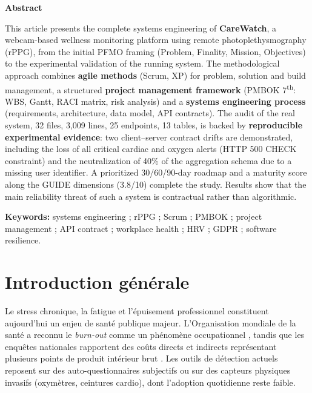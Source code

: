 \documentclass[11pt,a4paper]{article}
\begin{document}
\vspace{0.8cm}
\begin{center}
\color{cwblue}\bfseries\Large Abstract
\end{center}
\noindent This article presents the complete systems engineering of \textbf{CareWatch}, a webcam-based
wellness monitoring platform using remote photoplethysmography (rPPG), from the initial PFMO framing
(Problem, Finality, Mission, Objectives) to the experimental validation of the running system. The
methodological approach combines \textbf{agile methods} (Scrum, XP) for problem, solution and build
management, a structured \textbf{project management framework} (PMBOK 7\textsuperscript{th}: WBS, Gantt,
RACI matrix, risk analysis) and a \textbf{systems engineering process} (requirements, architecture, data
model, API contracts). The audit of the real system, 32 files, 3,009 lines, 25 endpoints, 13 tables,
is backed by \textbf{reproducible experimental evidence}: two client--server contract drifts are
demonstrated, including the loss of all critical cardiac and oxygen alerts (HTTP 500 CHECK constraint)
and the neutralization of 40\% of the aggregation schema due to a missing user identifier. A prioritized
30/60/90-day roadmap and a maturity score along the GUIDE dimensions (3.8/10) complete the study.
Results show that the main reliability threat of such a system is contractual rather than algorithmic.

\vspace{0.3cm}
\noindent\textbf{Keywords:} systems engineering ; rPPG ; Scrum ; PMBOK ; project management ; API
contract ; workplace health ; HRV ; GDPR ; software resilience.

\newpage
\tableofcontents
\newpage
\listoffigures
\newpage

\section{Introduction générale}
\label{sec:intro}

Le stress chronique, la fatigue et l'épuisement professionnel constituent aujourd'hui un enjeu de santé
publique majeur. L'Organisation mondiale de la santé a reconnu le \textit{burn-out} comme un phénomène
occupationnel \cite{oms2019}, tandis que les enquêtes nationales rapportent des coûts directs et
indirects représentant plusieurs points de produit intérieur brut \cite{ocde2023}. Les outils de
détection actuels reposent sur des auto-questionnaires subjectifs \cite{maslach1981} ou sur des
capteurs physiques invasifs (oxymètres, ceintures cardio), dont l'adoption quotidienne reste faible.
\end{document}

